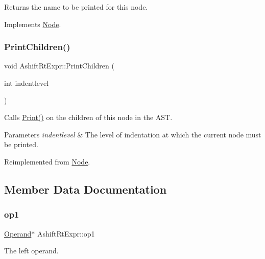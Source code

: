 Returns the name to be printed for this node. 

Implements \hyperlink{class_node_a56e29657306ffb004d69c6929ae44269}{Node}.

\mbox{\label{class_ashift_rt_expr_a2964d2199eef48495ab173bf2170eb8b}} 
\subsubsection{\texorpdfstring{Print\+Children()}{PrintChildren()}}
{\footnotesize\ttfamily void Ashift\+Rt\+Expr\+::\+Print\+Children (\begin{DoxyParamCaption}\item[{int}]{indentlevel }\end{DoxyParamCaption})\hspace{0.3cm}{\ttfamily [virtual]}}

Calls \hyperlink{class_node_a9ef727fd72d1a37792b3db60a8a479dd}{Print()} on the children of this node in the A\+ST. 
\begin{DoxyParams}{Parameters}
{\em indentlevel} & The level of indentation at which the current node must be printed. \\
\hline
\end{DoxyParams}


Reimplemented from \hyperlink{class_node_a3e67ec8d22182b721717af14fe0c3000}{Node}.



\subsection{Member Data Documentation}
\mbox{\label{class_ashift_rt_expr_a9559eedf8e5f553ec14eb4503c956ab8}} 
\subsubsection{\texorpdfstring{op1}{op1}}
{\footnotesize\ttfamily \hyperlink{class_operand}{Operand}$\ast$ Ashift\+Rt\+Expr\+::op1\hspace{0.3cm}{\ttfamily [protected]}}

The left operand. \mbox{\label{class_ashift_rt_expr_af343100baf13dc58ccbb76a7224ff449}} 
